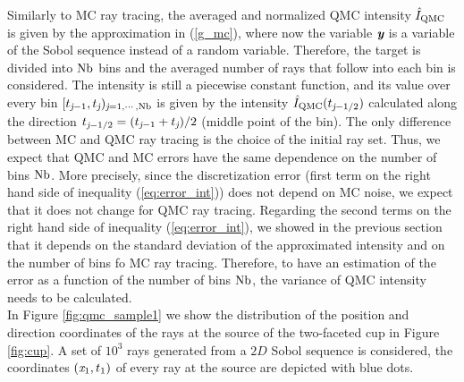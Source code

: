 Similarly to MC ray tracing, the averaged and normalized QMC intensity $\hat{I}_{\textrm{QMC}}$ is given by the approximation in (\ref{g_mc}), where now the variable $\textit{\textbf{y}}$ is a variable of the Sobol sequence instead of a random variable. Therefore, the target is divided into $\textrm{Nb}$ bins and the averaged number of rays that follow into each bin is considered. The intensity is still a piecewise constant function, and its value over every bin $[t_{\textit{j}-1}, t_{\textit{j}})_{\textit{j}=1, \cdots, \textrm{Nb}}$ is given by the intensity $\hat{I}_{\textrm{QMC}}(t_{\textit{j}-1/2})$ calculated along the direction $t_{\textit{j}-1/2} = (t_{\textit{j}-1}+t_{\textit{j}})/2$ (middle point of the bin). The only difference between MC and QMC ray tracing is the choice of the initial ray set. Thus, we expect that QMC and MC errors have the same dependence on the number of bins $\textrm{Nb}$. More precisely, since the discretization error (first term on the right hand side of inequality (\ref{eq:error_int})) does not depend on MC noise, we expect that it does not change for QMC ray tracing. Regarding the second terms on the right hand side of inequality (\ref{eq:error_int}), we showed in the previous section that it depends on the standard deviation of the approximated intensity and on the number of bins fo MC ray tracing. Therefore, to have an estimation of the error as a function of the number of bins $\textrm{Nb}$, the variance of QMC intensity needs to be calculated.  
\\ \indent In Figure \ref{fig:qmc_sample1} we show the distribution of the position and direction coordinates of the rays at the source of the two-faceted cup in Figure \ref{fig:cup}. 
A set of $10^3$ rays generated from a $2D$ Sobol sequence is considered, the coordinates $(\textit{x}_1, t_1)$ of every ray at the source are depicted with blue dots.
